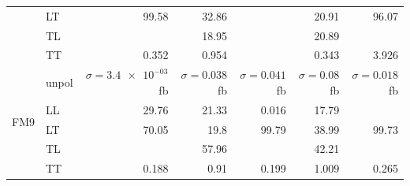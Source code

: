 \begin{table}[h]
{\begin{tabular}{llrrrrr}
 & LT & \num{99.58} & \num{32.86} &  & \num{20.91} & \num{96.07} \\
 & TL &  & \num{18.95} &  & \num{20.89} &  \\
 & TT & \num{0.352} & \num{0.954} &  & \num{0.343} & \num{3.926} \\
\midrule
\multirow{5}{*}{FM9}
 & unpol & $\sigma = \num{3.4e-03}$ fb & $\sigma = \num{0.038}$ fb & $\sigma = \num{0.041}$ fb & $\sigma = \num{0.08}$ fb & $\sigma = \num{0.018}$ fb \\
 & LL & \num{29.76} & \num{21.33} & \num{0.016} & \num{17.79} &  \\
 & LT & \num{70.05} & \num{19.8} & \num{99.79} & \num{38.99} & \num{99.73} \\
 & TL &  & \num{57.96} &  & \num{42.21} &  \\
 & TT & \num{0.188} & \num{0.91} & \num{0.199} & \num{1.009} & \num{0.265} \\
\bottomrule
\end{tabular}
}%
\end{table}
\newpage
